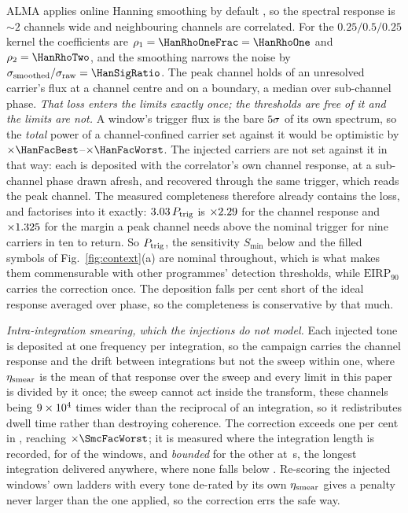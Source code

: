 ALMA applies online Hanning smoothing by default \citep{ALMAHandbook}, so
the spectral response is ${\sim}2$ channels wide and neighbouring channels
are correlated. For the $0.25/0.5/0.25$ kernel the coefficients
are $\rho_1=\HanRhoOneFrac=\HanRhoOne$ and $\rho_2=\HanRhoTwo$, and the
smoothing narrows the noise by
$\sigma_{\rm smoothed}/\sigma_{\rm raw}=\HanSigRatio$. The peak
channel holds \HanBest{} of an unresolved carrier's flux at a channel centre
and \HanWorst{} on a boundary, a median \HanMed{} over sub-channel phase.
\emph{That loss enters the limits exactly once; the thresholds are free of it
and the limits are not.} A window's trigger flux is the bare
$5\sigma$ of its own spectrum, so the \emph{total} power of a
channel-confined carrier set against it would be optimistic by
$\times\HanFacBest$--$\times\HanFacWorst$. The injected carriers are not set
against it in that way: each is deposited with the correlator's own channel
response, at a sub-channel phase drawn afresh, and recovered through the same
trigger, which reads the peak channel. The measured completeness therefore
already contains the loss, and factorises into it exactly:
$3.03\,P_{\rm trig}$ is $\times2.29$ for the channel
response and $\times1.325$ for the margin a peak channel needs
above the nominal trigger for nine carriers in ten to return. So
$P_{\rm trig}$, the sensitivity $S_{\min}$ below and the filled symbols of
Fig.~\ref{fig:context}(a) are nominal throughout, which is what makes them
commensurable with other programmes' detection thresholds, while
$\mathrm{EIRP}_{90}$ carries the correction once.
The deposition falls \InjShortPct{} per cent short of the ideal response
averaged over phase, so the completeness is conservative by that much.

\emph{Intra-integration smearing, which the injections do not model.} Each
injected tone is deposited at one frequency per integration, so the campaign
carries the channel response and the drift between integrations but not the
sweep within one, where
$\eta_{\rm smear}$ is the mean of that response over the sweep and every
limit in this paper is divided by it once; the sweep cannot act inside the
transform, these channels being $9\times10^{4}$ times wider than the
reciprocal of an integration, so it redistributes dwell time rather than
destroying coherence. The correction exceeds one per cent in
\NmRespNApplied, reaching $\times\SmcFacWorst$; it is measured where the
integration length is recorded, for \SmcNMeas{} of the \NWindows{} windows,
and \emph{bounded} for the other \SmcNBound{} at \SmcDtCeil\,s, the longest
integration delivered anywhere, where none falls below \SmcBoundEta.
Re-scoring the \SmcValNWin{} injected windows' own ladders with every tone
de-rated by its own $\eta_{\rm smear}$ gives a penalty never larger than the
one applied, so the correction errs the safe way.

